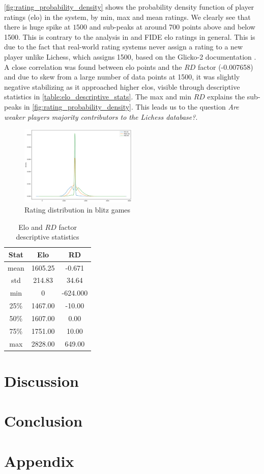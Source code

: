 \documentclass[sigconf]{acmart}
\begin{document}
\autoref{fig:rating_probability_density} shows the probability density function of player ratings (elo) in the system,
by min, max and mean ratings. We clearly see that there is huge spike at $1500$ and sub-peaks at around 700 points above and below 1500. This is contrary to the analysis in \cite{vaci2017chess} and FIDE elo ratings in general. This is due to the fact that real-world rating systems never assign a rating to a new player unlike Lichess, which assigns 1500, based on the Glicko-2 documentation \cite{glickman1995glicko}. A close correlation was found between elo points  and the $RD$ factor (-0.007658) and due to skew from a large number of data points at 1500, it was slightly negative stabilizing as it approached higher elos, visible through descriptive statistics in \autoref{table:elo_descriptive_stats}. The max and min $RD$ explains the sub-peaks in \autoref{fig:rating_probability_density}. This leads us to the question \textit{Are weaker players majority contributors to the Lichess database?}.

\begin{figure}[htbp]
\caption{Rating distribution in blitz games}
\label{fig:rating_probability_density}
\includegraphics[width=0.5\textwidth]{blitz_rating_distribution}
\end{figure}

\begin{table}[htbp]
\caption{Elo and $RD$ factor descriptive statistics}
\label{table:elo_descriptive_stats}
\begin{tabular}{|c|c|c|}
  \hline
  Stat & Elo & RD \\
  \hline
  mean & 1605.25 & -0.671 \\
  std & 214.83 & 34.64 \\
  min & 0 & -624.000 \\
  25\% & 1467.00 & -10.00 \\
  50\% & 1607.00 & 0.00 \\
  75\% & 1751.00 & 10.00 \\
  max & 2828.00 & 649.00 \\
  \hline
\end{tabular}
\end{table}

\section{Discussion}

\section{Conclusion}




\section*{Appendix}
\begin{appendix}

\end{appendix}
\end{document}
